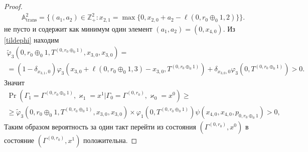 \documentclass[a4paper,12pt,russian]{extarticle}
\begin{document}
\begin{proof}
\begin{align*}
 &{\mathbb A}_{\mathrm{trans}}^2= \{(a_1,a_2) \in \mathbb{Z}_+^2 \colon  x_{2,1}=\max{\{0,x_{2,0}+a_2-\ell(0,r_0\oplus_{0}1,2)\}}\}.
\end{align*}
не пусто и содержит как минимум один элемент $(a_1,a_2)=(0,x_{4,0})$. Из \eqref{tildephi} находим
\begin{multline*}
\widetilde{\varphi}_3(0,r_0\oplus_{0}1,T^{(0,r_0\oplus_{0}1)},x_{3,0},x_{3,0}) =\\ = (1-\delta_{x_{3,1},0}) \varphi_3(x_{3,0} + \ell (0,r_0\oplus_{0}1,3) - x_{3,0},T^{(0,r_0\oplus_{0}1)} )
+\delta_{x_{3,0},0} \varphi_3 (0,T^{(0,r_0\oplus_{0}1)}) > 0.
\end{multline*}
Значит
\begin{multline*}
\Pr (\Gamma_{1}=\Gamma^{(0,r_0\oplus_{0}1)},\varkappa_{1}=x^1 | \Gamma_{0}=\Gamma^{(0,r_0)},\varkappa_0=x^0)\geqslant \\
\geqslant \widetilde{\varphi}_3(0,r_0\oplus_{0}1,T^{(0,r_0\oplus_{0}1)},x_{3,0},x_{3,0})
\times
\varphi_1(0,T^{(0,r_0\oplus_{0}1)})  \psi(x_{4,0},x_{4,0}, p_{0,r_0\oplus_{0}1}) > 0,
\end{multline*}
Таким образом вероятность за один такт перейти из состояния $(\Gamma^{(0,r_0)}, x^0)$ в состояние $ (\Gamma^{(0,r_0)}, x^1)$ положительна.


\end{proof}
\end{document}
